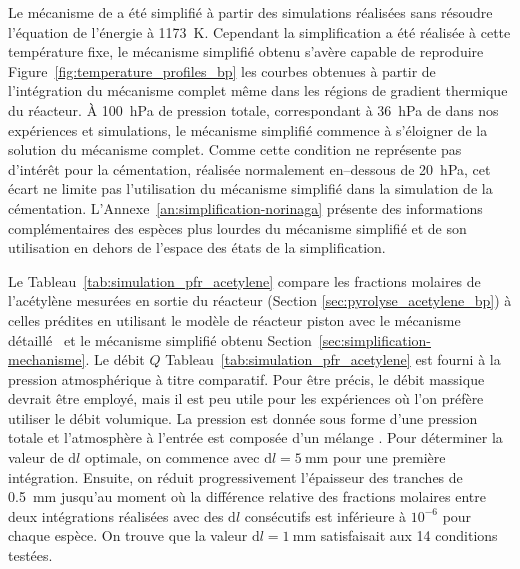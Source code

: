 Le mécanisme de \citet{Norinaga2009} a été simplifié à partir des simulations réalisées sans résoudre l'équation de l'énergie à \SI{1173}{\kelvin}. Cependant la simplification a été réalisée à cette température fixe, le mécanisme simplifié obtenu s'avère capable de reproduire \textendash{} Figure~\ref{fig:temperature_profiles_bp} \textendash{} les courbes obtenues à partir de l'intégration du mécanisme complet même dans les régions de gradient thermique du réacteur. À \SI{100}{\hecto\pascal} de pression totale, correspondant à \SI{36}{\hecto\pascal} de  dans nos expériences et simulations, le mécanisme simplifié commence à s'éloigner de la solution du mécanisme complet. Comme cette condition ne représente pas d'intérêt pour la cémentation, réalisée normalement en--dessous de \SI{20}{\hecto\pascal}, cet écart ne limite pas l'utilisation du mécanisme simplifié dans la simulation de la cémentation.
L'Annexe~\ref{an:simplification-norinaga} présente des informations complémentaires des espèces plus lourdes du mécanisme simplifié et de son utilisation en dehors de l'espace des états de la simplification.

Le Tableau~\ref{tab:simulation_pfr_acetylene} compare les fractions molaires de l'acétylène mesurées en sortie du réacteur (Section \ref{sec:pyrolyse_acetylene_bp}) à celles prédites en utilisant le modèle de réacteur piston avec le mécanisme détaillé~\cite{Norinaga2009} et le mécanisme simplifié obtenu Section~\ref{sec:simplification-mechanisme}. Le débit $Q$ Tableau~\ref{tab:simulation_pfr_acetylene} est fourni à la pression atmosphérique à titre comparatif. Pour être précis, le débit massique devrait être employé, mais il est peu utile pour les expériences où l'on préfère utiliser le débit volumique. La pression est donnée sous forme d'une pression totale et l'atmosphère à l'entrée est composée d'un mélange . Pour déterminer la valeur de $\mathrm{d}l$ optimale, on commence avec $\mathrm{d}l=\SI{5}{\milli\metre}$ pour une première intégration. Ensuite, on réduit progressivement l'épaisseur des tranches de \SI{0,5}{\milli\metre} jusqu'au moment o\`{u} la différence relative des fractions molaires entre deux intégrations réalisées avec des $\mathrm{d}l$ consécutifs est inférieure à $10^{-6}$ pour chaque espèce. On trouve que la valeur $\mathrm{d}l=\SI{1}{\milli\metre}$ satisfaisait aux 14 conditions testées.

